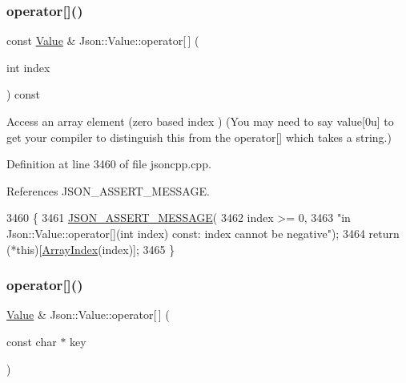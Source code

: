 \subsubsection{\texorpdfstring{operator[]()}{operator[]()}\hspace{0.1cm}{\footnotesize\ttfamily [4/9]}}
{\footnotesize\ttfamily const \hyperlink{class_json_1_1_value}{Value} \& Json\+::\+Value\+::operator\mbox{[}$\,$\mbox{]} (\begin{DoxyParamCaption}\item[{int}]{index }\end{DoxyParamCaption}) const}

Access an array element (zero based index ) (You may need to say \textquotesingle{}value\mbox{[}0u\mbox{]}\textquotesingle{} to get your compiler to distinguish this from the operator\mbox{[}\mbox{]} which takes a string.) 

Definition at line 3460 of file jsoncpp.\+cpp.



References J\+S\+O\+N\+\_\+\+A\+S\+S\+E\+R\+T\+\_\+\+M\+E\+S\+S\+A\+GE.


\begin{DoxyCode}
3460                                               \{
3461   \hyperlink{json_8h_ad7facdeeca0f495765e3b204c265eadb}{JSON\_ASSERT\_MESSAGE}(
3462       index >= 0,
3463       \textcolor{stringliteral}{"in Json::Value::operator[](int index) const: index cannot be negative"});
3464   \textcolor{keywordflow}{return} (*\textcolor{keyword}{this})[\hyperlink{class_json_1_1_value_a184a91566cccca7b819240f0d5561c7d}{ArrayIndex}(index)];
3465 \}
\end{DoxyCode}
\mbox{\label{class_json_1_1_value_acb912f4ec40a25ea6eb387730885f3d9}} 
\subsubsection{\texorpdfstring{operator[]()}{operator[]()}\hspace{0.1cm}{\footnotesize\ttfamily [5/9]}}
{\footnotesize\ttfamily \hyperlink{class_json_1_1_value}{Value} \& Json\+::\+Value\+::operator\mbox{[}$\,$\mbox{]} (\begin{DoxyParamCaption}\item[{const char $\ast$}]{key }\end{DoxyParamCaption})}


